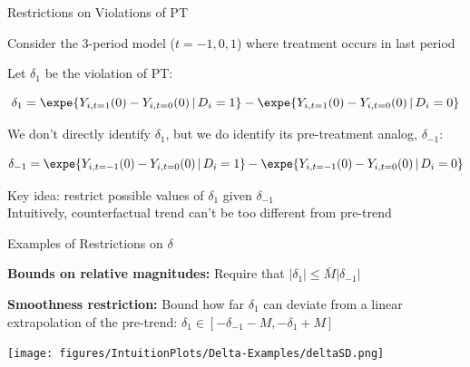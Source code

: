 \documentclass[aspectratio = 169, 13pt]{beamer}
\begin{document}
\begin{frame}{Restrictions on Violations of PT}
	\begin{wideitemize}
		
		\item
		Consider the 3-period model ($t=-1,0,1$) where treatment occurs in last period
		
		\item
		Let $\delta_1$ be the violation of PT:
		
		$$\delta_1 = \expe{ Y_{i,t=1}(0) - Y_{i,t=0}(0) \,|\, D_i = 1} - \expe{ Y_{i,t=1}(0) - Y_{i,t=0}(0) \,|\, D_i = 0} $$
		
		\item
		We don't directly identify $\delta_1$, but we do identify its pre-treatment analog, $\delta_{-1}$:
		
		$$\delta_{-1} = \expe{ Y_{i,t=-1}(0) - Y_{i,t=0}(0) \,|\, D_i = 1} - \expe{ Y_{i,t=-1}(0) - Y_{i,t=0}(0) \,|\, D_i = 0} $$
		
		\item
		Key idea: restrict possible values of $\delta_1$ given $\delta_{-1}$ \\
		
		Intuitively, counterfactual trend can't be too different from pre-trend
		
	\end{wideitemize}
\end{frame}


\begin{frame}{Examples of Restrictions on $\delta$}
	\begin{wideitemize}
		
		\item \textbf{Bounds on relative magnitudes:} Require that $|\delta_1| \leq \bar{M} |\delta_{-1}|$
		
		\pause
		
		\item \textbf{Smoothness restriction:} Bound how far $\delta_1$ can deviate from a linear extrapolation of the pre-trend: $\delta_1 \in [-\delta_{-1}-M , -\delta_{1} + M]$
		
	\end{wideitemize}
	
	\centering
	\texttt{[image: figures/IntuitionPlots/Delta-Examples/deltaSD.png]}
	
\end{frame}
\end{document}
